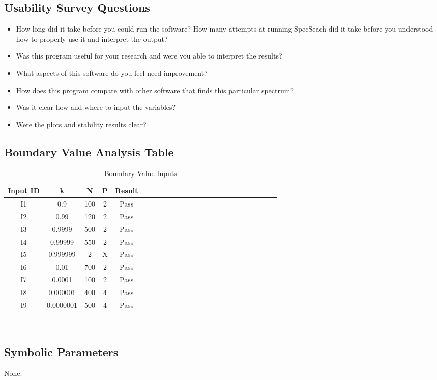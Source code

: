 \documentclass[12pt, titlepage]{article}
\begin{document}
\subsection{Usability Survey Questions}
\label{UsabilitySurvey}
\begin{itemize}
	\item How long did it take before you could run the software? How many 
	attempts at running SpecSeach did it take before you understood how to 
	properly use it and interpret the output?
	\item Was this program useful for your research and were you able to 
	interpret the results? 
	\item What aspects of this software do you feel need improvement?
	\item How does this program compare with other software that finds this 
	particular spectrum? 
	\item Was it clear how and where to input the variables? 
	\item Were the plots and stability results clear? 
\end{itemize}  

\clearpage
\subsection{Boundary Value Analysis Table}
\begin{table}[h!]
	\centering
	\begin{tabular}{|c|c|c|c|c|c|c|c|c|c|c|c|c|c|c|c|c|c|c|c|c|c|c|c|}
		\hline        
		Input ID& k& N & P & Result \\
		\hline
		I1      &0.9 &100 &2 & Pass \\ \hline
		I2     &0.99 &120 &2 & Pass \\ \hline
		I3     &0.9999 &500 &2 & Pass\\ \hline 
		I4     &0.99999 &550 &2 & Pass \\ \hline 
		I5      &0.999999 &2 &X & Pass \\ \hline
		I6     &0.01 &700 & 2& Pass \\ \hline
		I7    &0.0001 &100 & 2& Pass\\ \hline 
		I8     &0.000001 &400 &4& Pass \\ \hline
		I9      &0.0000001 &500 &4 & Pass \\ 
		\hline
	\end{tabular}\\
	\caption{Boundary Value Inputs}
	\label{Table:D_13}
\end{table} 

\subsection{Symbolic Parameters}

None.
\end{document}
